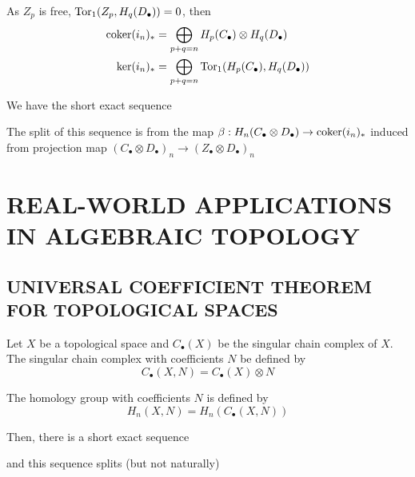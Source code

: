 \documentclass{article}
\begin{document}
\begin{longproof}
\begin{enumerate}
    \end{enumerate}

    As $Z_p$ is free, $\operatorname{Tor}_1(Z_p, H_q(D_\bullet)) = 0$, then 
    \begin{align*}
        \operatorname{coker}(i_n)_* &= \bigoplus_{p+q=n} H_p(C_\bullet) \otimes H_q(D_\bullet) \\
        \ker (i_n)_* &= \bigoplus_{p+q=n} \operatorname{Tor}_1(H_p(C_\bullet), H_q(D_\bullet))
    \end{align*}
    
    We have the short exact sequence

    \begin{center}
    \end{center}

    The split of this sequence is from the map $\beta: H_n(C_\bullet \otimes D_\bullet) \to \operatorname{coker}(i_n)_*$ induced from projection map $(C_\bullet \otimes D_\bullet)_n \to (Z_\bullet \otimes D_\bullet)_n$
    
\end{longproof}




\section{REAL-WORLD APPLICATIONS IN ALGEBRAIC TOPOLOGY}

\subsection{UNIVERSAL COEFFICIENT THEOREM FOR TOPOLOGICAL SPACES}

\begin{theorem}
    Let $X$ be a topological space and $C_\bullet(X)$ be the singular chain complex of $X$. The singular chain complex with coefficients $N$ be defined by
    $$
        C_\bullet(X, N) = C_\bullet(X) \otimes N
    $$
    
    The homology group with coefficients $N$ is defined by
    $$
        H_n(X, N) = H_n(C_\bullet(X, N))
    $$
    
    Then, there is a short exact sequence
    \begin{center}
    \end{center}

    and this sequence splits (but not naturally)
    
\end{theorem}
\end{document}
